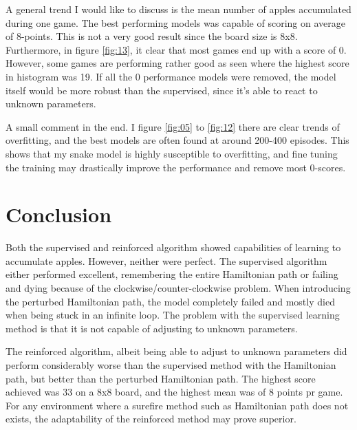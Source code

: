 \documentclass[%
 uio,
 jmp,
 amsmath,amssymb,
 reprint, nofootinbib]{revtex4-1}
\numberwithin{equation}{section}
\begin{document}
A general trend I would like to discuss is the mean number of apples accumulated during one game. The best performing models was capable of scoring on average of 8-points. This is not a very good result since the board size is 8x8. Furthermore, in figure \ref{fig:13}, it clear that most games end up with a score of 0. However, some games are performing rather good as seen where the highest score in histogram was 19. If all the 0 performance models were removed, the model itself would be more robust than the supervised, since it's able to react to unknown parameters.

A small comment in the end. I figure \ref{fig:05} to \ref{fig:12} there are clear trends of overfitting, and the best models are often found at around 200-400 episodes. This shows that my snake model is highly susceptible to overfitting, and fine tuning the training may drastically improve the performance and remove most 0-scores.


\section{Conclusion}\label{sec:Conclusion}

Both the supervised and reinforced algorithm showed capabilities of learning to accumulate apples. However, neither were perfect. The supervised algorithm either performed excellent, remembering the entire Hamiltonian path or failing and dying because of the clockwise/counter-clockwise problem. When introducing the perturbed Hamiltonian path, the model completely failed and mostly died when being stuck in an infinite loop. The problem with the supervised learning method is that it is not capable of adjusting to unknown parameters.

The reinforced algorithm, albeit being able to adjust to unknown parameters did perform considerably worse than the supervised method with the Hamiltonian path, but better than the perturbed Hamiltonian path. The highest score achieved was 33 on a 8x8 board, and the highest mean was of 8 points pr game. For any environment where a surefire method such as Hamiltonian path does not exists, the adaptability of the reinforced method may prove superior.





\onecolumngrid


 
\end{document}
